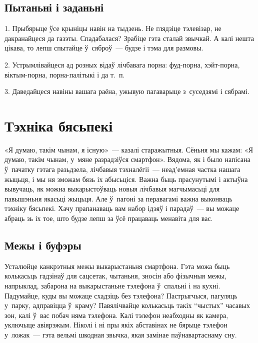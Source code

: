 \subsection*{Пытаньні і заданьні}

1. Прыбярыце ўсе крыніцы навін на тыдзень. Не глядзіце тэлевізар, не дакранайцеся да газэты. Спадабалася? Зрабіце гэта сталай звычкай. А калі нешта цікава, то лепш спытайце ў~сяброў~--- будзе і тэма для размовы.

2. Устрымлівайцеся ад розных відаў лічбавага порна: фуд-порна, хэйт-порна, віктым-порна, порна-палітыкі і да т.~п.

3. Даведайцеся навіны вашага раёна, ужывую пагаварыце з~суседзямі і сябрамі.


\section{Тэхніка бясьпекі}

«Я думаю, такім чынам, я існую»~--- казалі старажытныя. Сёньня мы кажам: «Я думаю, такім чынам, у~мяне разрадзіўся смартфон». Вядома, як і было напісана ў~пачатку гэтага разьдзела, лічбавыя тэхналёгіі~--- неад'емная частка нашага жыцьця, і мы ня зможам бязь іх абысьціся. Важна быць прасунутымі і актыўна вывучаць, як можна выкарыстоўваць новыя лічбавыя магчымасьці для павышэньня якасьці жыцьця. Але ў~пагоні за перавагамі важна выконваць тэхніку бясьпекі. Хачу прапанаваць вам набор ідэяў і парадаў~--- вы можаце абраць зь іх тое, што будзе лепш за ўсё працаваць менавіта для вас.

\subsection*{Межы і буфэры}

Усталюйце канкрэтныя межы выкарыстаньня смартфона. Гэта можа быць колькасьць гадзінаў для сацсетак, чытаньня, зносін або фізычныя межы, напрыклад, забарона на выкарыстаньне тэлефона ў~спальні і на кухні. Падумайце, куды вы можаце схадзіць без тэлефона? Пастрыгчыся, пагуляць у~парку, адправіцца ў~краму? Павялічвайце колькасьць такіх ``чыстых'' часавых зон, калі ў~вас побач няма тэлефона. Калі тэлефон неабходны як камера, уключыце авіярэжым. Ніколі і ні пры якіх абставінах не бярыце тэлефон у~ложак~--- гэта вельмі шкодная звычка, якая замінае паўнавартаснаму сну.


